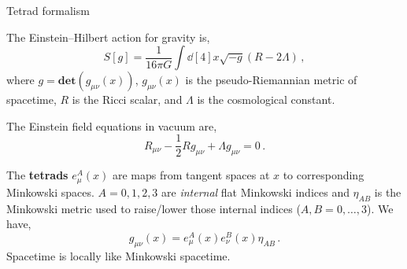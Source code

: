 \documentclass{beamer}
\newcommand\boldtext[1]{\textcolor{bolds}{\textbf{#1}}}
\newcommand\italictext[1]{\textcolor{italics}{\textit{#1}}}
\begin{document}
\begin{frame}{Tetrad formalism}
    \begin{list}{\maltese}{\leftmargin=1em \itemindent=0em}
        \item<1-> The Einstein–Hilbert action for gravity is,
        \begin{equation}
            S[g]=\frac{1}{16\pi G}\int\dd[4]{x}\sqrt{-g}(R-2\Lambda)\,,
        \end{equation}
        where $g=\mathbf{det}(g_{\mu\nu}(x))$, $g_{\mu\nu}(x)$ is the pseudo-Riemannian metric of spacetime, $R$ is the Ricci scalar, and $\Lambda$ is the cosmological constant.
        \item<2-> The Einstein field equations in vacuum are,
        \begin{equation}
            R_{\mu\nu}-\frac{1}{2}Rg_{\mu\nu}+\Lambda g_{\mu\nu}=0\,.
        \end{equation}
        \item<3-> The \boldtext{tetrads} $e_\mu^A(x)$ are maps from tangent spaces at $x$ to corresponding Minkowski spaces. $A=0,1,2,3$ are \italictext{internal} flat Minkowski indices and $\eta_{AB}$ is the Minkowski metric used to raise/lower those internal indices ($A,B=0, \dots, 3$). We have,
        \begin{equation}
            g_{\mu\nu}(x)=e_\mu^A(x)e_\nu^B(x)\eta_{AB}\,.
        \end{equation}
        Spacetime is locally like Minkowski spacetime.
    \end{list}
\end{frame}
\end{document}
